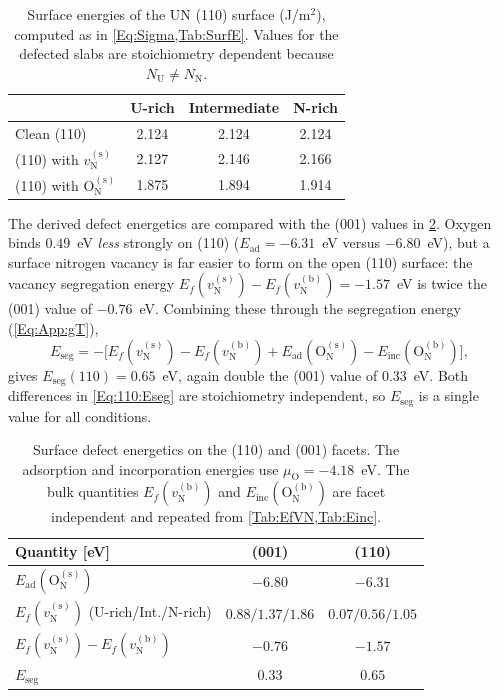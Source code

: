 \documentclass[preprint,12pt,sort&compress]{elsarticle}
\newcommand{\?}{\stackrel{?}{=}}
\begin{document}
\begin{table}[h!]
\centering
\footnotesize
\caption{Surface energies of the UN (110) surface (J/m$^2$), computed as in \cref{Eq:Sigma,Tab:SurfE}. Values for the defected slabs are stoichiometry dependent because $N_\text{U}\neq N_\text{N}$.}
\begin{tabular}{lccc}
\hline
 & U-rich & Intermediate & N-rich \\
\hline
Clean (110)                                 & 2.124 & 2.124 & 2.124 \\
(110) with $v_\text{N}^{(\text{s})}$        & 2.127 & 2.146 & 2.166 \\
(110) with $\text{O}_\text{N}^{(\text{s})}$ & 1.875 & 1.894 & 1.914 \\
\hline
\end{tabular}
\label{Tab:110:surfE}
\end{table}

The derived defect energetics are compared with the (001) values in \cref{Tab:110:defE}. Oxygen binds $0.49$~eV \emph{less} strongly on (110) ($E_\text{ad}=-6.31$~eV versus $-6.80$~eV), but a surface nitrogen vacancy is far easier to form on the open (110) surface: the vacancy segregation energy $E_f(v_\text{N}^{(\text{s})})-E_f(v_\text{N}^{(\text{b})})=-1.57$~eV is twice the (001) value of $-0.76$~eV. Combining these through the segregation energy (\cref{Eq:App:gT}),
\begin{equation}
E_\text{seg}=-\bigl[E_f(v_\text{N}^{(\text{s})})-E_f(v_\text{N}^{(\text{b})}) + E_\text{ad}(\text{O}_\text{N}^{(\text{s})}) - E_\text{inc}(\text{O}_\text{N}^{(\text{b})})\bigr],
\label{Eq:110:Eseg}
\end{equation}
gives $E_\text{seg}(110)=0.65$~eV, again double the (001) value of $0.33$~eV. Both differences in \cref{Eq:110:Eseg} are stoichiometry independent, so $E_\text{seg}$ is a single value for all conditions.

\begin{table}[h!]
\centering
\footnotesize
\caption{Surface defect energetics on the (110) and (001) facets. The adsorption and incorporation energies use $\mu_\text{O}=-4.18$~eV. The bulk quantities $E_f(v_\text{N}^{(\text{b})})$ and $E_\text{inc}(\text{O}_\text{N}^{(\text{b})})$ are facet independent and repeated from \cref{Tab:EfVN,Tab:Einc}.}
\begin{tabular}{lcc}
\hline
Quantity [eV] & (001) & (110) \\
\hline
$E_\text{ad}(\text{O}_\text{N}^{(\text{s})})$               & $-6.80$ & $-6.31$ \\
$E_f(v_\text{N}^{(\text{s})})$ (U-rich/Int./N-rich)         & $0.88/1.37/1.86$ & $0.07/0.56/1.05$ \\
$E_f(v_\text{N}^{(\text{s})})-E_f(v_\text{N}^{(\text{b})})$ & $-0.76$ & $-1.57$ \\
$E_\text{seg}$                                              & $0.33$  & $0.65$ \\
\hline
\end{tabular}
\label{Tab:110:defE}
\end{table}
\end{document}
